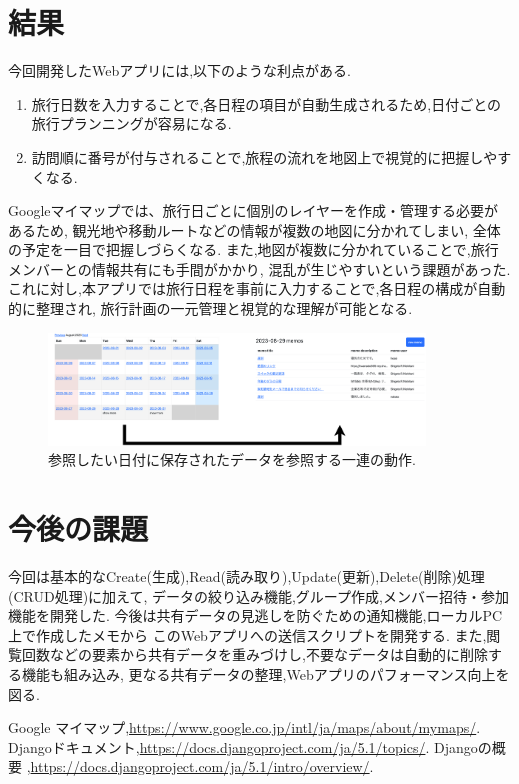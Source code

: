 \documentclass[a4j,twocolumn]{jsarticle}
\begin{document}
\section{結果}
\label{sec:org1986df1}
今回開発したWebアプリには,以下のような利点がある.
\begin{enumerate}
\item 旅行日数を入力することで,各日程の項目が自動生成されるため,日付ごとの旅行プランニングが容易になる.
\item 訪問順に番号が付与されることで,旅程の流れを地図上で視覚的に把握しやすくなる.
\end{enumerate}
Googleマイマップでは、旅行日ごとに個別のレイヤーを作成・管理する必要があるため, 観光地や移動ルートなどの情報が複数の地図に分かれてしまい,
全体の予定を一目で把握しづらくなる. また,地図が複数に分かれていることで,旅行メンバーとの情報共有にも手間がかかり,
混乱が生じやすいという課題があった.
これに対し,本アプリでは旅行日程を事前に入力することで,各日程の構成が自動的に整理され,
旅行計画の一元管理と視覚的な理解が可能となる.

\begin{figure}[htbp]
\centering
\includegraphics[width=10cm]{./figs/app_motion.png}
\caption{\label{fig:org595fc94}参照したい日付に保存されたデータを参照する一連の動作.}
\end{figure}


\section{今後の課題}
\label{sec:orge33d91c}
今回は基本的なCreate(生成),Read(読み取り),Update(更新),Delete(削除)処理(CRUD処理)に加えて,
データの絞り込み機能,グループ作成,メンバー招待・参加機能を開発した.
今後は共有データの見逃しを防ぐための通知機能,ローカルPC上で作成したメモから
このWebアプリへの送信スクリプトを開発する.
また,閲覧回数などの要素から共有データを重みづけし,不要なデータは自動的に削除する機能も組み込み,
更なる共有データの整理,Webアプリのパフォーマンス向上を図る.


\small\setlength\baselineskip{10pt}
\begin{thebibliography}{9}

 Google マイマップ,\url{https://www.google.co.jp/intl/ja/maps/about/mymaps/}.
Djangoドキュメント,\url{https://docs.djangoproject.com/ja/5.1/topics/}.
Djangoの概要 ,\url{https://docs.djangoproject.com/ja/5.1/intro/overview/}.
\end{thebibliography}
\end{document}
